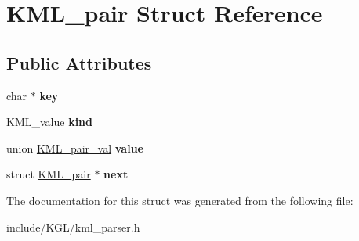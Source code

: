 \hypertarget{struct_k_m_l__pair}{}\section{K\+M\+L\+\_\+pair Struct Reference}
\label{struct_k_m_l__pair}
\subsection*{Public Attributes}
\begin{DoxyCompactItemize}
\item 
\mbox{\label{struct_k_m_l__pair_abe3260519067ad778195ebd861f06618}} 
char $\ast$ {\bfseries key}
\item 
\mbox{\label{struct_k_m_l__pair_a752b623259b90b2e9af47c840c56469b}} 
K\+M\+L\+\_\+value {\bfseries kind}
\item 
\mbox{\label{struct_k_m_l__pair_aa4d6772d8aa16f733f7d655253ed38c3}} 
union \mbox{\hyperlink{union_k_m_l__pair__val}{K\+M\+L\+\_\+pair\+\_\+val}} {\bfseries value}
\item 
\mbox{\label{struct_k_m_l__pair_a59a036d9ce09cea5618048103ef156eb}} 
struct \mbox{\hyperlink{struct_k_m_l__pair}{K\+M\+L\+\_\+pair}} $\ast$ {\bfseries next}
\end{DoxyCompactItemize}


The documentation for this struct was generated from the following file\+:\begin{DoxyCompactItemize}
\item 
include/\+K\+G\+L/kml\+\_\+parser.\+h\end{DoxyCompactItemize}
